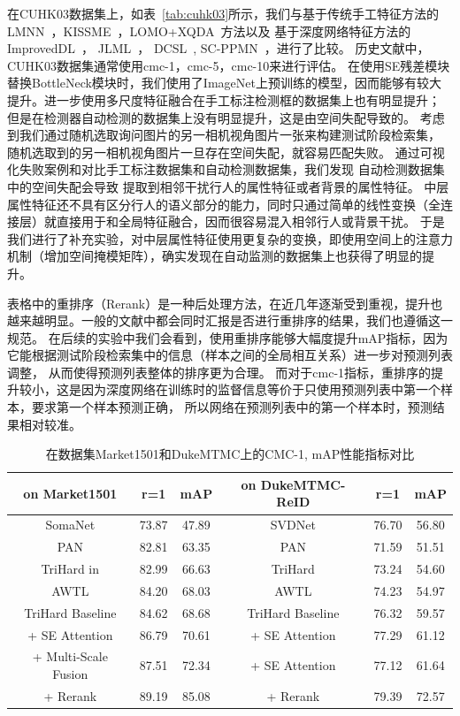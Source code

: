 在CUHK03数据集上，如表~\ref{tab:cuhk03}所示，我们与基于传统手工特征方法的 LMNN~\cite{lmnn}，KISSME~\cite{kissme}，LOMO+XQDA~\cite{xqda}方法以及
基于深度网络特征方法的 ImprovedDL~\cite{improveddl}， JLML~\cite{jlml}， DCSL~\cite{yaqing2016semantics}, SC-PPMN~\cite{mao2018multi}，进行了比较。
历史文献中，CUHK03数据集通常使用cmc-1，cmc-5，cmc-10来进行评估。
在使用SE残差模块替换BottleNeck模块时，我们使用了ImageNet上预训练的模型，因而能够有较大提升。进一步使用多尺度特征融合在手工标注检测框的数据集上也有明显提升；
但是在检测器自动检测的数据集上没有明显提升，这是由空间失配导致的。
考虑到我们通过随机选取询问图片的另一相机视角图片一张来构建测试阶段检索集，
随机选取到的另一相机视角图片一旦存在空间失配，就容易匹配失败。
通过可视化失败案例和对比手工标注数据集和自动检测数据集，我们发现
自动检测数据集中的空间失配会导致
提取到相邻干扰行人的属性特征或者背景的属性特征。
中层属性特征还不具有区分行人的语义部分的能力，同时只通过简单的线性变换（全连接层）就直接用于和全局特征融合，因而很容易混入相邻行人或背景干扰。
于是我们进行了补充实验，对中层属性特征使用更复杂的变换，即使用空间上的注意力机制（增加空间掩模矩阵），确实发现在自动监测的数据集上也获得了明显的提升。

表格中的重排序（Rerank）是一种后处理方法，在近几年逐渐受到重视，提升也越来越明显。一般的文献中都会同时汇报是否进行重排序的结果，我们也遵循这一规范。
在后续的实验中我们会看到，使用重排序能够大幅度提升mAP指标，因为它能根据测试阶段检索集中的信息（样本之间的全局相互关系）进一步对预测列表调整，
从而使得预测列表整体的排序更为合理。
而对于cmc-1指标，重排序的提升较小，这是因为深度网络在训练时的监督信息等价于只使用预测列表中第一个样本，要求第一个样本预测正确，
所以网络在预测列表中的第一个样本时，预测结果相对较准。

\begin{table}
	\centering
	\caption{在数据集Market1501和DukeMTMC上的CMC-1, mAP性能指标对比}
	\label{tab:market}
	\begin{tabular}{c|cc|c|cc}
		\hline
		on Market1501                        & r=1   & mAP   & on DukeMTMC-ReID & r=1   & mAP   \\ \hline 
		SomaNet                              & 73.87 & 47.89 & SVDNet           & 76.70 & 56.80 \\ 
		PAN                                  & 82.81 & 63.35 & PAN              & 71.59 & 51.51 \\  
		TriHard in \cite{hermans2017defense} & 82.99 & 66.63 & TriHard          & 73.24 & 54.60 \\ 
		AWTL                                 & 84.20 & 68.03 & AWTL             & 74.23 & 54.97 \\ \hline  \hline 
		TriHard Baseline                     & 84.62 & 68.68 & TriHard Baseline & 76.32 & 59.57 \\
		+ SE Attention                       & 86.79 & 70.61 & + SE Attention   & 77.29 & 61.12 \\
		+ Multi-Scale Fusion                 & 87.51 & 72.34 & + SE Attention   & 77.12 & 61.64 \\
		+ Rerank                             & 89.19 & 85.08 & + Rerank         & 79.39 & 72.57 \\ \hline
	\end{tabular}
\end{table}


